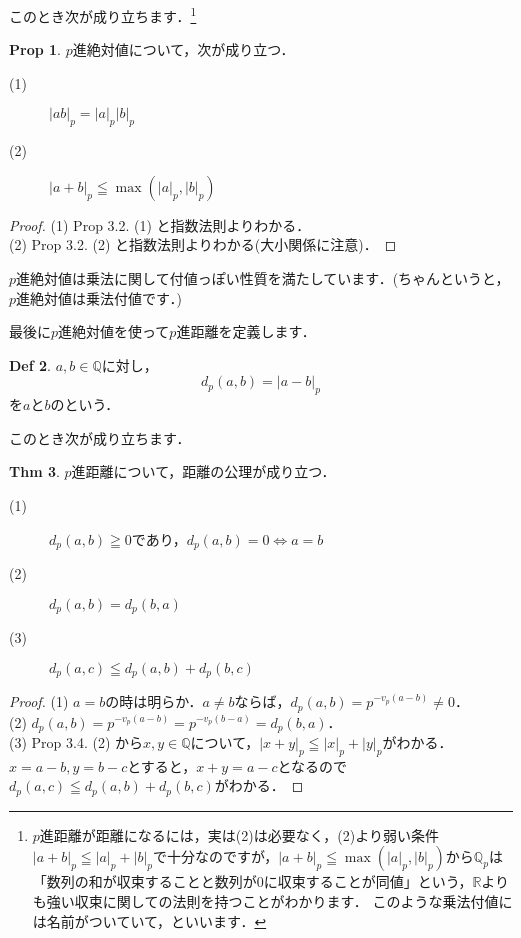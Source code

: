 \documentclass[./main]{subfiles}
\theoremstyle{definition}
\newtheorem{theo}{Thm}[section]
\newtheorem{defi}[theo]{Def}
\newtheorem{prop}[theo]{Prop}
\newcommand{\Q}{\mathbb{Q}}%
\newcommand{\Qp}{\mathbb{Q}_p}%
\newcommand{\R}{\mathbb{R}}%
\newcommand{\abs}[1]{\left\lvert#1\right\rvert}%
\begin{document}
このとき次が成り立ちます．\footnote{$p$進距離が距離になるには，実は(2)は必要なく，(2)より弱い条件$\abs{a+b}_p \leqq \abs{a}_p+\abs{b}_p$で十分なのですが，$\abs{a+b}_p \leqq \max(\abs{a}_p,\abs{b}_p)$から$\Qp$は「数列の和が収束することと数列が0に収束することが同値」という，$\R$よりも強い収束に関しての法則を持つことがわかります．
このような乗法付値には名前がついていて，といいます．}
\begin{prop}
$p$進絶対値について，次が成り立つ．
\begin{description}
	\item[(1)] $\abs{ab}_p=\abs{a}_p \abs{b}_p$
	\item[(2)] $\abs{a+b}_p \leqq \max(\abs{a}_p,\abs{b}_p)$
\end{description}
\end{prop}

\begin{proof}
	(1) Prop 3.2. (1) と指数法則よりわかる．\\
	(2) Prop 3.2. (2) と指数法則よりわかる(大小関係に注意)．
\end{proof}


$p$進絶対値は乗法に関して付値っぽい性質を満たしています．(ちゃんというと，$p$進絶対値は乗法付値です．)

最後に$p$進絶対値を使って$p$進距離を定義します．

\begin{defi}
$a,b \in \Q$に対し，
\begin{equation*}
d_p(a,b)=\abs{a-b}_p
\end{equation*}
を$a$と$b$のという．
\end{defi}

このとき次が成り立ちます．
\begin{theo}
$p$進距離について，距離の公理が成り立つ．
\begin{description}
	\item[(1)] $d_p(a,b) \geqq	0$であり，$d_p(a,b)=0 \Longleftrightarrow a=b$ 
	\item[(2)] $d_p(a,b)=d_p(b,a)$ 
	\item[(3)] $d_p(a,c) \leqq d_p(a,b) +d_p(b,c)$
\end{description}
\end{theo}

\begin{proof}
	(1) $a=b$の時は明らか．$a \neq b$ならば，$d_p(a,b)=p^{-v_p(a-b)} \neq 0$．\\
	(2) $d_p(a,b)=p^{-v_p(a-b)}=p^{-v_p(b-a)}=d_p(b,a)$．\\
	(3) Prop 3.4. (2) から$x,y \in \Q$について，$\abs{x+y}_p \leqq \abs{x}_p+\abs{y}_p$がわかる．$x=a-b,y=b-c$とすると，$x+y=a-c$となるので$d_p(a,c) \leqq d_p(a,b) +d_p(b,c)$がわかる．
\end{proof}
\end{document}
